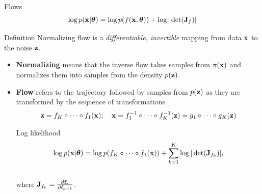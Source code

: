 \begin{frame}{Flows}
	\vspace{-0.3cm}
	\[
	\log p(\mathbf{x}|\boldsymbol{\theta}) = \log p(f(\mathbf{x}, \boldsymbol{\theta})) + \log |\det (\mathbf{J}_f)|
	\]
	\vspace{-0.4cm}
	\begin{block}{Definition}
		Normalizing flow is a \textit{differentiable, invertible} mapping from data $\mathbf{x}$ to the noise $\mathbf{z}$. 
	\end{block}
	\begin{itemize}
		\item \textbf{Normalizing} means that the inverse flow takes samples from $\pi(\mathbf{x})$ and normalizes them into samples from the density $p(\mathbf{z})$.
		\item \textbf{Flow} refers to the trajectory followed by samples from $p(\mathbf{z})$ as they are transformed by the sequence of transformations
		\[
		\mathbf{z} = f_K \circ \dots \circ f_1(\mathbf{x}); \quad \mathbf{x} = f_1^{-1} \circ \dots \circ f_K^{-1} (\mathbf{z}) = g_1 \circ \dots \circ g_K(\mathbf{z}) 
		\] 
		\vspace{-0.4cm}
		\begin{block}{Log likelihood}
			\vspace{-0.4cm}
			\[
			\log p(\mathbf{x} | \boldsymbol{\theta}) = \log p(f_K \circ \dots \circ f_1(\mathbf{x})) + \sum_{k=1}^K\log |\det (\mathbf{J}_{f_k})|,
			\]
			\vspace{-0.4cm} \\
			where $\mathbf{J}_{f_k} = \frac{\partial \mathbf{f}_k}{\partial \mathbf{f}_{k-1}}$.
		\end{block}
	\end{itemize}
\end{frame}
